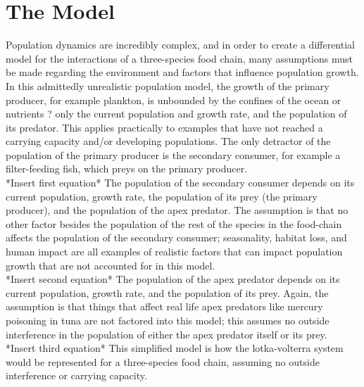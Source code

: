 \documentclass[11pt,oneside]{article}
\begin{document}
\section{The Model}
Population dynamics are incredibly complex, and in order to create a differential model for the interactions of a three-species food chain, many assumptions must be made regarding the environment and factors that influence population growth. 
In this admittedly unrealistic population model, the growth of the primary producer, for example plankton, is unbounded by the confines of the ocean or nutrients ? only the current population and growth rate, and the population of its predator. This applies practically to examples that have not reached a carrying capacity and/or developing populations. The only detractor of the population of the primary producer is the secondary consumer, for example a filter-feeding fish, which preys on the primary producer.\\ 
*Insert first equation*
The population of the secondary consumer depends on its current population, growth rate, the population of its prey (the primary producer), and the population of the apex predator. The assumption is that no other factor besides the population of the rest of the species in the food-chain affects the population of the secondary consumer; seasonality, habitat loss, and human impact are all examples of realistic factors that can impact population growth that are not accounted for in this model. \\
*Insert second equation*
The population of the apex predator depends on its current population, growth rate, and the population of its prey. Again, the assumption is that things that affect real life apex predators like mercury poisoning in tuna are not factored into this model; this assumes no outside interference in the population of either the apex predator itself or its prey.\\
*Insert third equation*
This simplified model is how the lotka-volterra system would be represented for a three-species food chain, assuming no outside interference or carrying capacity.
\end{document}
